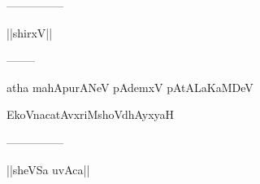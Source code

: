 \documentclass{article}
\begin{document}
\begin{center}
---------------
\end{center}

\begin{center}
||shirxV||
\end{center}

\begin{center}
--------
\end{center}

\begin{center}
atha mahApurANeV pAdemxV pAtALaKaMDeV
\end{center}

\begin{center}
EkoVnacatAvxriMshoVdhAyxyaH
\end{center}

\begin{center}
---------------
\end{center}

\begin{center}
||sheVSa uvAca||
\end{center}
\end{document}
